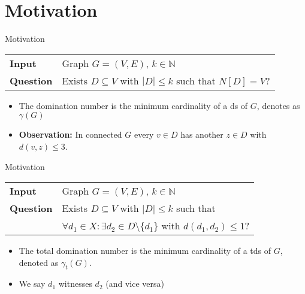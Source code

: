\section{Motivation}
\begin{frame}[c]{Motivation}
\begin{tcolorbox}[colback=TUMBlueLighter,title=\dom]
    \begin{tabularx}{1.0\textwidth}{>{\hsize=0.30\hsize}X>{\hsize=0.8\hsize}X}
        \textbf{Input} & Graph $G = (V, E)$, $k \in \mathbb{N}$\\
        \textbf{Question} & Exists {$D \subseteq V$} with $|D| \leq k$ such that ${N[D] = V}$? \\
    \end{tabularx}
\end{tcolorbox}

\begin{itemize}
\pause \item The domination number is the minimum cardinality of a ds of $G$, denotes as $\gamma(G)$
\pause \item \textbf{Observation:} In connected $G$ every $v\in D$ has another $z \in D$ with $d(v,z) \leq 3$.
\end{itemize}

\end{frame}

\begin{frame}[c]{Motivation}
\begin{tcolorbox}[colback=TUMBlueLighter,title=\tdom]
    \begin{tabularx}{1.0\textwidth}{>{\hsize=0.30\hsize}X>{\hsize=0.8\hsize}X}
        \textbf{Input} & Graph $G = (V, E)$, $k \in \mathbb{N}$\\
        \textbf{Question} & Exists $D \subseteq V$ with $|D| \leq k$ such that \\ 
       &  $\forall d_1 \in X :\exists d_2 \in D \setminus \{d_1\}$ with ${d(d_1, d_2) \leq 1}$? \\
    \end{tabularx}
\end{tcolorbox}

\begin{itemize}
 \pause \item The total domination number is the minimum cardinality of a tds of $G$, denoted as $\gamma_t(G)$.
 \pause \item We say $d_1$ witnesses $d_2$ (and vice versa)
\end{itemize}

\end{frame}


